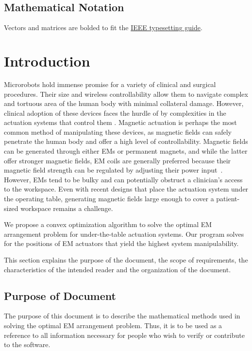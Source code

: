 \documentclass[12pt]{article}
\begin{document}
\subsection{Mathematical Notation}
Vectors and matrices are bolded to fit the \hyperlink{https://journals.ieeeauthorcenter.ieee.org/your-role-in-article-production/ieee-editorial-style-manual/}{IEEE typesetting guide}.

\newpage

\section{Introduction}
Microrobots hold immense promise for a variety of clinical and surgical procedures. Their size and wireless
controllability allow them to navigate complex and tortuous area of the human body with minimal collateral damage. However,
clinical adoption of these devices faces the hurdle of by complexities in the actuation systems that control them \citep{bozuyuk2024roadmap}. Magnetic actuation is 
perhaps the most common method of manipulating these devices, as magnetic fields can safely penetrate the human body and offer a high level of controllability. Magnetic fields can be generated through either EMs
or permanent magnets, and while the latter offer stronger magnetic fields, EM coils are generally preferred
because their magnetic field strength can be regulated by adjusting their power input~\citep{hwang2020review}. However, EMs tend to be bulky and can potentially obstruct a clinician's access to the workspace. Even with recent designs that place the actuation system under the operating table, generating magnetic fields large enough to cover a patient-sized workspace remains a challenge. 

We propose a convex optimization algorithm to solve the optimal EM arrangement problem for under-the-table actuation systems. Our program solves for the positions of EM actuators that yield the highest system manipulability. 

This section explains the purpose of the document, the scope of requirements, the characteristics of the intended reader and the organization of the document.

\subsection{Purpose of Document}
The purpose of this document is to describe the mathematical methods used in solving the optimal EM arrangement problem. Thus, it is to be used as a reference to all information necessary for people who wish to verify or contribute to the software. 
\end{document}
